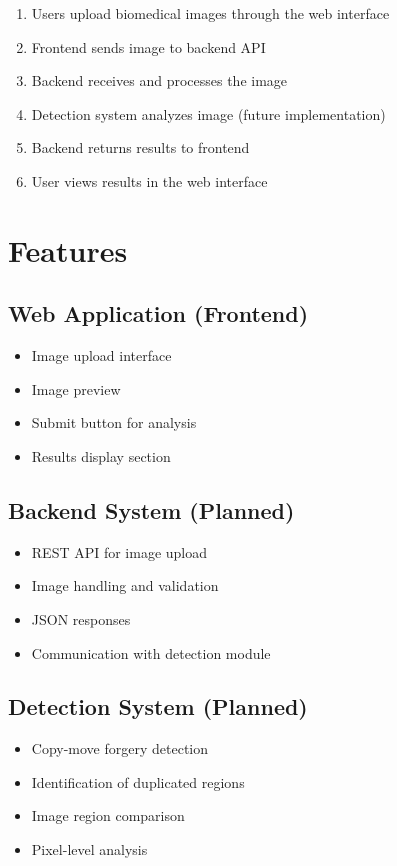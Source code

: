 \documentclass[12pt]{article}
\begin{document}
\begin{enumerate}[noitemsep]
    \item Users upload biomedical images through the web interface
    \item Frontend sends image to backend API
    \item Backend receives and processes the image
    \item Detection system analyzes image (future implementation)
    \item Backend returns results to frontend
    \item User views results in the web interface
\end{enumerate}

\section{Features}

\subsection{Web Application (Frontend)}
\begin{itemize}[noitemsep]
    \item Image upload interface
    \item Image preview
    \item Submit button for analysis
    \item Results display section
\end{itemize}

\subsection{Backend System (Planned)}
\begin{itemize}[noitemsep]
    \item REST API for image upload
    \item Image handling and validation
    \item JSON responses
    \item Communication with detection module
\end{itemize}

\subsection{Detection System (Planned)}
\begin{itemize}[noitemsep]
    \item Copy-move forgery detection
    \item Identification of duplicated regions
    \item Image region comparison
    \item Pixel-level analysis
\end{itemize}
\end{document}
